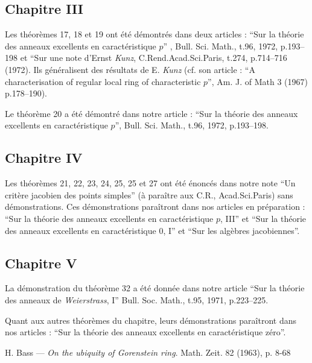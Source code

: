 {{\subsection*{Chapitre III}

Les théorèmes 17, 18 et 19 ont été démontrés dans deux articles : ``Sur la théorie des anneaux excellents en caractéristique $p$'' , Bull. Sci. Math., t.96, 1972, p.193--198 et ``Sur une note d’Ernst \emph{Kunz}, C.Rend.Acad.Sci.Paris, t.274, p.714--716 (1972). Ils généralisent des résultats de E. \emph{Kunz} (cf. son article : ``A characterisation of regular local ring of characteristic $p$'', Am. J. of Math 3 (1967) p.178--190).

Le théorème 20 a été démontré dans notre article : ``Sur la théorie des anneaux excellents en caractéristique $p$'', Bull. Sci. Math., t.96, 1972, p.193--198.

\subsection*{Chapitre IV}

Les théorèmes 21, 22, 23, 24, 25, 25 et 27 ont été énoncés dans notre note ``Un critère jacobien des points simples'' (à paraître aux C.R., Acad.Sci.Paris) sans démonstrations. Ces démonstrations paraîtront dans nos articles en préparation : ``Sur la théorie des anneaux excellents en caractéristique $p$, III'' et ``Sur la théorie des anneaux excellents en caractéristique $0$, I'' et ``Sur les algèbres jacobiennes''.

\subsection*{Chapitre V}

La démonstration du théorème 32 a été donnée dans notre article ``Sur la théorie des anneaux de \emph{Weierstrass}, I'' Bull. Soc. Math., t.95, 1971, p.223--225.

Quant aux autres théorèmes du chapitre, leurs démonstrations paraîtront dans nos articles : ``Sur la théorie des anneaux excellents en caractéristique zéro''.

\renewcommand{\bibname}{BIBLIOGRAPHIE}
\def\refname{B\MakeLowercase{IBLIOGRAPHIE}}
\begin{thebibliography}{99}\thispagestyle{empty}

  {\sc H. Bass} ---
  {\it On the ubiquity of Gorenstein ring}. Math. Zeit. 82 (1963), p. 8-68


\end{thebibliography}}}

